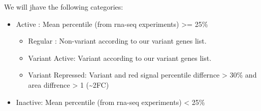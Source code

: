 \documentclass[11pt]{article}
\begin{document}
We will jhave the following categories:
\begin{itemize}
\item Active : Mean percentile (from rna-seq experiments) >= 25\%
\begin{itemize}
\item Regular : Non-variant according to our variant genes list.
\item Variant Active: Variant according to our variant genes list.
\item Variant Repressed: Variant and red signal percentile differnce > 30\% and area diffrence > 1 (\textasciitilde{}2FC)
\end{itemize}

\item Inactive: Mean percentile (from rna-seq experiments) < 25\%
\end{itemize}
\end{document}
